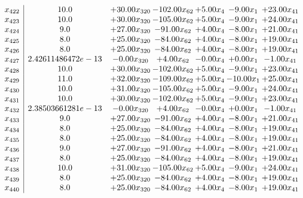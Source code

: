 \documentclass[8pt]{article}
\begin{document}
\[\begin{array}{c| c c@{\hskip 2pt} c@{\hskip 2pt} c@{\hskip 2pt} c@{\hskip 2pt} c@{\hskip 2pt} }
 x_{422}   &  10.0 & + 30.00 x_{320} & -102.00 x_{62} & +  5.00 x_{4} & -9.00 x_{1} & + 23.00 x_{41}\\
 x_{423}   &  10.0 & + 30.00 x_{320} & -105.00 x_{62} & +  5.00 x_{4} & -9.00 x_{1} & + 24.00 x_{41}\\
 x_{424}   &  9.0 & + 27.00 x_{320} & -91.00 x_{62} & +  4.00 x_{4} & -8.00 x_{1} & + 21.00 x_{41}\\
 x_{425}   &  8.0 & + 25.00 x_{320} & -84.00 x_{62} & +  4.00 x_{4} & -8.00 x_{1} & + 19.00 x_{41}\\
 x_{426}   &  8.0 & + 25.00 x_{320} & -84.00 x_{62} & +  4.00 x_{4} & -8.00 x_{1} & + 19.00 x_{41}\\
 x_{427}   &  2.42611486472e-13 & -0.00 x_{320} & +  4.00 x_{62} & -0.00 x_{4} & +  0.00 x_{1} & -1.00 x_{41}\\
 x_{428}   &  10.0 & + 30.00 x_{320} & -102.00 x_{62} & +  5.00 x_{4} & -9.00 x_{1} & + 23.00 x_{41}\\
 x_{429}   &  11.0 & + 32.00 x_{320} & -109.00 x_{62} & +  5.00 x_{4} & -10.00 x_{1} & + 25.00 x_{41}\\
 x_{430}   &  10.0 & + 31.00 x_{320} & -105.00 x_{62} & +  5.00 x_{4} & -9.00 x_{1} & + 24.00 x_{41}\\
 x_{431}   &  10.0 & + 30.00 x_{320} & -102.00 x_{62} & +  5.00 x_{4} & -9.00 x_{1} & + 23.00 x_{41}\\
 x_{432}   &  2.38503661281e-13 & -0.00 x_{320} & +  4.00 x_{62} & -0.00 x_{4} & +  0.00 x_{1} & -1.00 x_{41}\\
 x_{433}   &  9.0 & + 27.00 x_{320} & -91.00 x_{62} & +  4.00 x_{4} & -8.00 x_{1} & + 21.00 x_{41}\\
 x_{434}   &  8.0 & + 25.00 x_{320} & -84.00 x_{62} & +  4.00 x_{4} & -8.00 x_{1} & + 19.00 x_{41}\\
 x_{435}   &  8.0 & + 25.00 x_{320} & -84.00 x_{62} & +  4.00 x_{4} & -8.00 x_{1} & + 19.00 x_{41}\\
 x_{436}   &  9.0 & + 27.00 x_{320} & -91.00 x_{62} & +  4.00 x_{4} & -8.00 x_{1} & + 21.00 x_{41}\\
 x_{437}   &  8.0 & + 25.00 x_{320} & -84.00 x_{62} & +  4.00 x_{4} & -8.00 x_{1} & + 19.00 x_{41}\\
 x_{438}   &  10.0 & + 31.00 x_{320} & -105.00 x_{62} & +  5.00 x_{4} & -9.00 x_{1} & + 24.00 x_{41}\\
 x_{439}   &  8.0 & + 25.00 x_{320} & -84.00 x_{62} & +  4.00 x_{4} & -8.00 x_{1} & + 19.00 x_{41}\\
 x_{440}   &  8.0 & + 25.00 x_{320} & -84.00 x_{62} & +  4.00 x_{4} & -8.00 x_{1} & + 19.00 x_{41}\\

\end{array}\]
\end{document}
